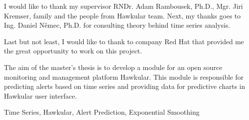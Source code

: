 \documentclass[12pt,oneside]{fithesis2}
\begin{document}
\FrontMatter                    %
\ThesisTitlePage                %
\begin{ThesisDeclaration}       %
  \DeclarationText
  \AdvisorName
\end{ThesisDeclaration}

\begin{ThesisThanks}            %
  I would like to thank my supervisor RNDr. Adam Rambousek, Ph.D., Mgr. Jiri Kremser,
  family and the people from Hawkular team. Next, my thanks goes to Ing. Daniel Němec, Ph.D.
  for consulting theory behind time series analysis.

  Last but not least, I would like to thank to company Red Hat that provided me 
  the great opportunity to work on this project.
\end{ThesisThanks}

\begin{ThesisAbstract}          %
  The aim of the master's thesis is to develop a module for an open source monitoring
  and management platform Hawkular. This module is responsible for predicting
  alerts based on time series and providing data for predictive charts in Hawkular user interface.
\end{ThesisAbstract}

\begin{ThesisKeyWords}          %
  Time Series, Hawkular, Alert Prediction, Exponential Smoothing
\end{ThesisKeyWords}

\tableofcontents                %

\MainMatter                     %

    

%

\appendix

\end{document}
